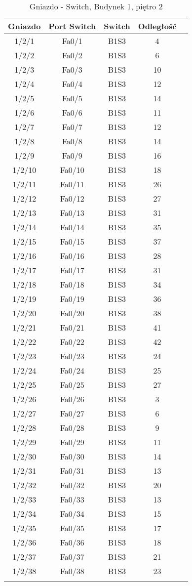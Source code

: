 \begin{center}
    \begin{longtable}{|c|c|c|c|c|}
    \hline
    Gniazdo & Port Switch & Switch & Odległość \\ \hline
	1/2/1 & Fa0/1 & B1S3 & 4 \\ \hline
	1/2/2 & Fa0/2 & B1S3 & 6 \\ \hline
	1/2/3 & Fa0/3 & B1S3 & 10 \\ \hline
	1/2/4 & Fa0/4 & B1S3 & 12 \\ \hline
	1/2/5 & Fa0/5 & B1S3 & 14 \\ \hline
	1/2/6 & Fa0/6 & B1S3 & 11 \\ \hline
	1/2/7 & Fa0/7 & B1S3 & 12 \\ \hline
	1/2/8 & Fa0/8 & B1S3 & 14 \\ \hline
	1/2/9 & Fa0/9 & B1S3 & 16 \\ \hline
	1/2/10 & Fa0/10 & B1S3 & 18 \\ \hline
	1/2/11 & Fa0/11 & B1S3 & 26 \\ \hline
	1/2/12 & Fa0/12 & B1S3 & 27 \\ \hline
	1/2/13 & Fa0/13 & B1S3 & 31 \\ \hline
	1/2/14 & Fa0/14 & B1S3 & 35 \\ \hline
	1/2/15 & Fa0/15 & B1S3 & 37 \\ \hline
	1/2/16 & Fa0/16 & B1S3 & 28 \\ \hline
	1/2/17 & Fa0/17 & B1S3 & 31 \\ \hline
	1/2/18 & Fa0/18 & B1S3 & 34 \\ \hline
	1/2/19 & Fa0/19 & B1S3 & 36 \\ \hline
	1/2/20 & Fa0/20 & B1S3 & 38 \\ \hline
	1/2/21 & Fa0/21 & B1S3 & 41 \\ \hline
	1/2/22 & Fa0/22 & B1S3 & 42 \\ \hline
	1/2/23 & Fa0/23 & B1S3 & 24 \\ \hline
	1/2/24 & Fa0/24 & B1S3 & 25 \\ \hline
	1/2/25 & Fa0/25 & B1S3 & 27 \\ \hline
	1/2/26 & Fa0/26 & B1S3 & 3 \\ \hline
	1/2/27 & Fa0/27 & B1S3 & 6 \\ \hline
	1/2/28 & Fa0/28 & B1S3 & 9 \\ \hline
	1/2/29 & Fa0/29 & B1S3 & 11 \\ \hline
	1/2/30 & Fa0/30 & B1S3 & 14 \\ \hline
	1/2/31 & Fa0/31 & B1S3 & 13 \\ \hline
	1/2/32 & Fa0/32 & B1S3 & 20 \\ \hline
	1/2/33 & Fa0/33 & B1S3 & 13 \\ \hline
	1/2/34 & Fa0/34 & B1S3 & 15 \\ \hline
	1/2/35 & Fa0/35 & B1S3 & 17 \\ \hline
	1/2/36 & Fa0/36 & B1S3 & 18 \\ \hline
	1/2/37 & Fa0/37 & B1S3 & 21 \\ \hline
	1/2/38 & Fa0/38 & B1S3 & 23 \\ \hline
	\caption{Gniazdo - Switch, Budynek 1, piętro 2}\\


\end{longtable}
\end{center}
